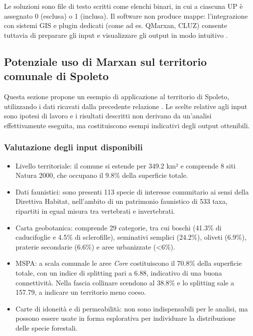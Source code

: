 \documentclass[
  a4paper,
]{book}
\providecommand{\tightlist}{%
  \setlength{\itemsep}{0pt}\setlength{\parskip}{0pt}}
\begin{document}
Le soluzioni sono file di testo scritti come elenchi binari, in cui a ciascuna UP è assegnato 0 (esclusa) o 1 (inclusa).
Il software non produce mappe: l'integrazione con sistemi GIS e plugin dedicati (come ad es. QMarxan, CLUZ) consente tuttavia di preparare gli input e visualizzare gli output in modo intuitivo \citep{ardron2010, ball2009, serra-sogas2020}.

\subsection{Potenziale uso di Marxan sul territorio comunale di Spoleto}\label{potenziale-uso-di-marxan-sul-territorio-comunale-di-spoleto}

Questa sezione propone un esempio di applicazione al territorio di Spoleto, utilizzando i dati ricavati dalla precedente relazione \citep{laporta2025}.
Le scelte relative agli input sono ipotesi di lavoro e i risultati descritti non derivano da un'analisi effettivamente eseguita, ma costituiscono esempi indicativi degli output ottenibili.

\subsubsection{Valutazione degli input disponibili}\label{valutazione-degli-input-disponibili}

\begin{itemize}
\tightlist
\item
  Livello territoriale: il comune si estende per 349.2 km² e comprende 8 siti Natura 2000, che occupano il 9.8\% della superficie totale.
\item
  Dati faunistici: sono presenti 113 specie di interesse comunitario ai sensi della Direttiva Habitat, nell'ambito di un patrimonio faunistico di 533 taxa, ripartiti in egual misura tra vertebrati e invertebrati.
\item
  Carta geobotanica: comprende 29 categorie, tra cui boschi (41.3\% di caducifoglie e 4.5\% di sclerofille), seminativi semplici (24.2\%), oliveti (6.9\%), praterie secondarie (6.6\%) e aree urbanizzate (\textless6\%).
\item
  MSPA: a scala comunale le aree \emph{Core} costituiscono il 70.8\% della superficie totale, con un indice di splitting pari a 6.88, indicativo di una buona connettività. Nella fascia collinare scendono al 38.8\% e lo splitting sale a 157.79, a indicare un territorio meno coeso.
\item
  Carte di idoneità e di permeabilità: non sono indispensabili per le analisi, ma possono essere usate in forma esplorativa per individuare la distribuzione delle specie forestali.
\end{itemize}
\end{document}
